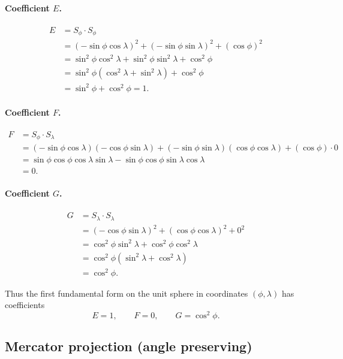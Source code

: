 \documentclass[12pt,a4paper]{article}
\theoremstyle{plain}
\theoremstyle{definition}      %
\begin{document}
\paragraph{Coefficient $E$.}
\[
\begin{aligned}
	E &= S_\phi\cdot S_\phi \\
	&= (-\sin\phi\cos\lambda)^2
	+(-\sin\phi\sin\lambda)^2
	+(\cos\phi)^2 \\
	&= \sin^2\phi\cos^2\lambda
	+\sin^2\phi\sin^2\lambda
	+\cos^2\phi \\
	&= \sin^2\phi(\cos^2\lambda+\sin^2\lambda)+\cos^2\phi \\
	&= \sin^2\phi + \cos^2\phi = 1.
\end{aligned}
\]

\paragraph{Coefficient $F$.}
\[
\begin{aligned}
	F &= S_\phi\cdot S_\lambda \\
	&= (-\sin\phi\cos\lambda)(-\cos\phi\sin\lambda)
	+(-\sin\phi\sin\lambda)(\cos\phi\cos\lambda)
	+(\cos\phi)\cdot 0 \\
	&= \sin\phi\cos\phi\cos\lambda\sin\lambda
	-\sin\phi\cos\phi\sin\lambda\cos\lambda \\
	&= 0.
\end{aligned}
\]

\paragraph{Coefficient $G$.}
\[
\begin{aligned}
	G &= S_\lambda\cdot S_\lambda \\
	&= (-\cos\phi\sin\lambda)^2
	+(\cos\phi\cos\lambda)^2
	+0^2 \\
	&= \cos^2\phi\sin^2\lambda
	+\cos^2\phi\cos^2\lambda \\
	&= \cos^2\phi(\sin^2\lambda+\cos^2\lambda) \\
	&= \cos^2\phi.
\end{aligned}
\]

Thus the first fundamental form on the unit sphere in
coordinates $(\phi,\lambda)$ has coefficients
\[
E = 1,\qquad F = 0,\qquad G = \cos^2\phi.
\]


\subsection*{Mercator projection (angle preserving)}
\end{document}
